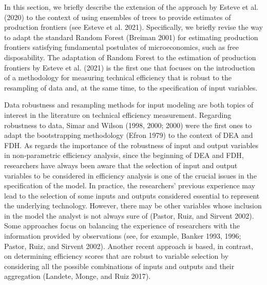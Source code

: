 In this section, we briefly describe the extension of the approach by Esteve et al. (2020) to the context of using ensembles of trees to provide estimates of production frontiers (see Esteve et al. 2021). Specifically, we briefly revise the way to adapt the standard Random Forest (Breiman 2001) for estimating production frontiers satisfying fundamental postulates of microeconomics, such as free disposability. The adaptation of Random Forest to the estimation of production frontiers by Esteve et al. (2021) is the first one that focuses on the introduction of a methodology for measuring technical efficiency that is robust to the resampling of data and, at the same time, to the specification of input variables.

Data robustness and resampling methods for input modeling are both topics of interest in the literature on technical efficiency measurement. Regarding robustness to data, Simar and Wilson (1998, 2000; 2000) were the first ones to adapt the bootstrapping methodology (Efron 1979) to the context of DEA and FDH. As regards the importance of the robustness of input and output variables in non-parametric efficiency analysis, since the beginning of DEA and FDH, researchers have always been aware that the selection of input and output variables to be considered in efficiency analysis is one of the crucial issues in the specification of the model. In practice, the researchers' previous experience may lead to the selection of some inputs and outputs considered essential to represent the underlying technology. However, there may be other variables whose inclusion in the model the analyst is not always sure of (Pastor, Ruiz, and Sirvent 2002). Some approaches focus on balancing the experience of researchers with the information provided by observations (see, for example, Banker 1993, 1996; Pastor, Ruiz, and Sirvent 2002). Another recent approach is based, in contrast, on determining efficiency scores that are robust to variable selection by considering all the possible combinations of inputs and outputs and their aggregation (Landete, Monge, and Ruiz 2017).

